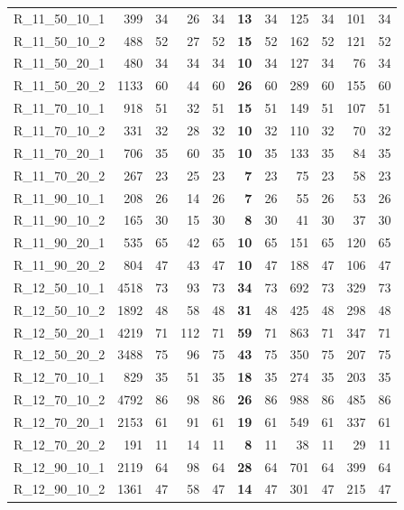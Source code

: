 \documentclass{article}
\begin{document}
\begin{longtable}{lrrrrrrrrrr}
R\_11\_50\_10\_1 & 399 & 34 & 26 & 34 & \textbf{13} & 34 & 125 & 34 & 101 & 34 \\
R\_11\_50\_10\_2 & 488 & 52 & 27 & 52 & \textbf{15} & 52 & 162 & 52 & 121 & 52 \\
R\_11\_50\_20\_1 & 480 & 34 & 34 & 34 & \textbf{10} & 34 & 127 & 34 & 76 & 34 \\
R\_11\_50\_20\_2 & 1133 & 60 & 44 & 60 & \textbf{26} & 60 & 289 & 60 & 155 & 60 \\
R\_11\_70\_10\_1 & 918 & 51 & 32 & 51 & \textbf{15} & 51 & 149 & 51 & 107 & 51 \\
R\_11\_70\_10\_2 & 331 & 32 & 28 & 32 & \textbf{10} & 32 & 110 & 32 & 70 & 32 \\
R\_11\_70\_20\_1 & 706 & 35 & 60 & 35 & \textbf{10} & 35 & 133 & 35 & 84 & 35 \\
R\_11\_70\_20\_2 & 267 & 23 & 25 & 23 & \textbf{7} & 23 & 75 & 23 & 58 & 23 \\
R\_11\_90\_10\_1 & 208 & 26 & 14 & 26 & \textbf{7} & 26 & 55 & 26 & 53 & 26 \\
R\_11\_90\_10\_2 & 165 & 30 & 15 & 30 & \textbf{8} & 30 & 41 & 30 & 37 & 30 \\
R\_11\_90\_20\_1 & 535 & 65 & 42 & 65 & \textbf{10} & 65 & 151 & 65 & 120 & 65 \\
R\_11\_90\_20\_2 & 804 & 47 & 43 & 47 & \textbf{10} & 47 & 188 & 47 & 106 & 47 \\
R\_12\_50\_10\_1 & 4518 & 73 & 93 & 73 & \textbf{34} & 73 & 692 & 73 & 329 & 73 \\
R\_12\_50\_10\_2 & 1892 & 48 & 58 & 48 & \textbf{31} & 48 & 425 & 48 & 298 & 48 \\
R\_12\_50\_20\_1 & 4219 & 71 & 112 & 71 & \textbf{59} & 71 & 863 & 71 & 347 & 71 \\
R\_12\_50\_20\_2 & 3488 & 75 & 96 & 75 & \textbf{43} & 75 & 350 & 75 & 207 & 75 \\
R\_12\_70\_10\_1 & 829 & 35 & 51 & 35 & \textbf{18} & 35 & 274 & 35 & 203 & 35 \\
R\_12\_70\_10\_2 & 4792 & 86 & 98 & 86 & \textbf{26} & 86 & 988 & 86 & 485 & 86 \\
R\_12\_70\_20\_1 & 2153 & 61 & 91 & 61 & \textbf{19} & 61 & 549 & 61 & 337 & 61 \\
R\_12\_70\_20\_2 & 191 & 11 & 14 & 11 & \textbf{8} & 11 & 38 & 11 & 29 & 11 \\
R\_12\_90\_10\_1 & 2119 & 64 & 98 & 64 & \textbf{28} & 64 & 701 & 64 & 399 & 64 \\
R\_12\_90\_10\_2 & 1361 & 47 & 58 & 47 & \textbf{14} & 47 & 301 & 47 & 215 & 47 \\

\end{longtable}
\end{document}
